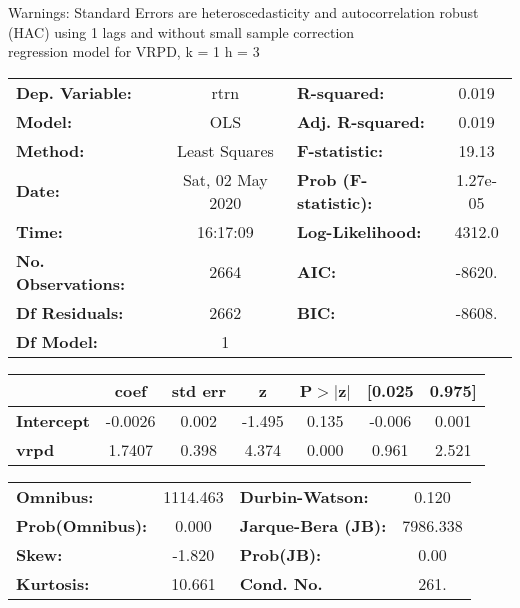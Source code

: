 Warnings: \newline
 [1] Standard Errors are heteroscedasticity and autocorrelation robust (HAC) using 1 lags and without small sample correction\\ 

regression model for VRPD, k = 1 h = 3\begin{center}
\begin{tabular}{lclc}
\toprule
\textbf{Dep. Variable:}    &       rtrn       & \textbf{  R-squared:         } &     0.019   \\
\textbf{Model:}            &       OLS        & \textbf{  Adj. R-squared:    } &     0.019   \\
\textbf{Method:}           &  Least Squares   & \textbf{  F-statistic:       } &     19.13   \\
\textbf{Date:}             & Sat, 02 May 2020 & \textbf{  Prob (F-statistic):} &  1.27e-05   \\
\textbf{Time:}             &     16:17:09     & \textbf{  Log-Likelihood:    } &    4312.0   \\
\textbf{No. Observations:} &        2664      & \textbf{  AIC:               } &    -8620.   \\
\textbf{Df Residuals:}     &        2662      & \textbf{  BIC:               } &    -8608.   \\
\textbf{Df Model:}         &           1      & \textbf{                     } &             \\
\bottomrule
\end{tabular}
\begin{tabular}{lcccccc}
                   & \textbf{coef} & \textbf{std err} & \textbf{z} & \textbf{P$> |$z$|$} & \textbf{[0.025} & \textbf{0.975]}  \\
\midrule
\textbf{Intercept} &      -0.0026  &        0.002     &    -1.495  &         0.135        &       -0.006    &        0.001     \\
\textbf{vrpd}      &       1.7407  &        0.398     &     4.374  &         0.000        &        0.961    &        2.521     \\
\bottomrule
\end{tabular}
\begin{tabular}{lclc}
\textbf{Omnibus:}       & 1114.463 & \textbf{  Durbin-Watson:     } &    0.120  \\
\textbf{Prob(Omnibus):} &   0.000  & \textbf{  Jarque-Bera (JB):  } & 7986.338  \\
\textbf{Skew:}          &  -1.820  & \textbf{  Prob(JB):          } &     0.00  \\
\textbf{Kurtosis:}      &  10.661  & \textbf{  Cond. No.          } &     261.  \\
\bottomrule
\end{tabular}
\end{center}

